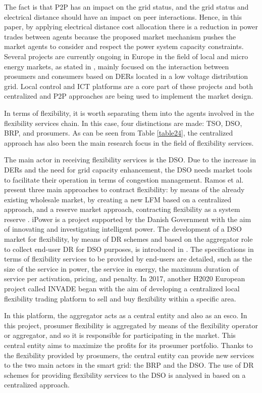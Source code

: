 The fact is that P2P has an impact on the grid status, and the grid status and electrical distance should have an impact on peer interactions. Hence, in this paper, by applying electrical distance cost allocation there is a reduction in power trades between agents because the proposed market mechanism pushes the market agents to consider and respect the power system capacity constraints.
Several projects are currently ongoing in Europe in the field of local and micro energy markets, as stated in \cite{sousa2018peer}, mainly focused on the interaction between prosumers and consumers based on DERs located in a low voltage distribution grid. Local control and ICT platforms are a core part of these projects and both centralized \cite{ilieva2016design} and P2P \cite{moret2018energy, Enerchain, mihaylov2014nrgcoin} approaches are being used to implement the market design.

In terms of flexibility, it is worth separating them into the agents involved in the flexibility services chain. In this case, four distinctions are made: TSO, DSO, BRP, and prosumers. As can be seen from Table \ref{table24}, the centralized approach has also been the main research focus in the field of flexibility services. 

The main actor in receiving flexibility services is the DSO. Due to the increase in DERs and the need for grid capacity enhancement, the DSO needs market tools to facilitate their operation in terms of congestion management. Ramos et al. present three main approaches to contract flexibility: by means of the already existing wholesale market, by creating a new LFM based on a centralized approach, and a reserve market approach, contracting flexibility as a system reserve \cite{ramos2016realizing}. iPower is a project supported by the Danish Government with the aim of innovating and investigating intelligent power. The development of a DSO market for flexibility, by means of DR schemes and based on the aggregator role to collect end-user DR for DSO purposes, is introduced in \cite{nordentoft2013development}. The specifications in terms of flexibility services to be provided by end-users are detailed, such as the size of the service in power, the service in energy, the maximum duration of service per activation, pricing, and penalty. In 2017, another H2020 European project called INVADE began \cite{Olivella2018} with the aim of developing a centralized local flexibility trading platform to sell and buy flexibility within a specific area.

In this platform, the aggregator acts as a central entity and also as an esco. In this project, prosumer flexibility is aggregated by means of the flexibility operator or aggregator, and so it is responsible for participating in the market. This central entity aims to maximize the profits for its prosumer portfolio. Thanks to the flexibility provided by prosumers, the central entity can provide new services to the two main actors in the smart grid: the BRP and the DSO. The use of DR schemes for providing flexibility services to the DSO is analysed in \cite{spiliotis2016demand, poudineh2014distributed} based on a centralized approach.


